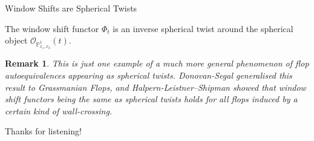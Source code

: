 \documentclass{beamer}
\newtheorem{remark}[theorem]{Remark}
\begin{document}
\begin{frame}{Window Shifts are Spherical Twists}
    \begin{theorem}[Segal]
        The window shift functor $\Phi_{t}$ is an inverse spherical twist around the spherical object $\mathcal{O}_{\mathbb{P}^1_{x_1 , x_2}}(t)$.
    \end{theorem}

    \begin{remark}
        This is just one example of a much more general phenomenon of flop autoequivalences appearing as spherical twists. Donovan-Segal generalised this result to Grassmanian Flops, and Halpern-Leistner--Shipman showed that window shift functors being the same as spherical twists holds for all flops induced by a certain kind of wall-crossing.
    \end{remark}
\end{frame}
\begin{frame}{}
    Thanks for listening!
\end{frame}
\end{document}

